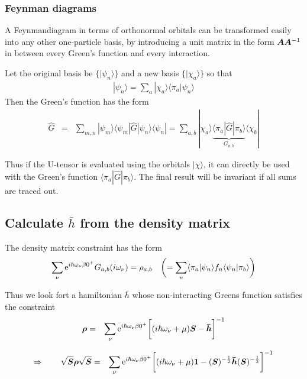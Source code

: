 \documentclass[11pt,a4paper]{report}
\begin{document}
\subsubsection{Feynman diagrams}
A Feynmandiagram in terms of orthonormal orbitals can be transformed
easily into any other one-particle basis, by introducing a unit matrix
in the form $\bm{A}\bm{A}^{-1}$ in between every Green's function
and every interaction. 

Let the original basis be $\{|\psi_n\rangle\}$
and a new basis $\{|\chi_a\rangle\}$ so that
\begin{eqnarray}
|\psi_n\rangle=\sum_a |\chi_a\rangle\langle\pi_a|\psi_n\rangle
\end{eqnarray}
Then the Green's function has the form
\begin{eqnarray}
\hat{G}&=&\sum_{m,n}|\psi_m\rangle
\langle\psi_m|\hat{G}|\psi_n\rangle\langle\psi_n|
=
\sum_{a,b}|\chi_a\rangle
\underbrace{\langle\pi_a|\hat{G}|\pi_b\rangle}_{G_{a,b}}\langle\chi_b|
\end{eqnarray}

Thus if the U-tensor is evaluated using the orbitals $|\chi\rangle$,
it can directly be used with the Green's function
$\langle\pi_a|\hat{G}|\pi_b\rangle$. The final result will be
invariant if all sums are traced out.


\subsection{Calculate $\bar{h}$ from the density matrix}
The density matrix constraint has the form
\begin{eqnarray}
\sum_\nu\mathrm{e}^{i\hbar\omega_\nu\beta0^+}G_{a,b}(i\omega_\nu)
=\rho_{a,b} 
\quad\biggl(=\sum_n\langle\pi_a|\psi_n\rangle f_n\langle\psi_n|\pi_b\rangle
\biggr)
\end{eqnarray}


Thus we look fort a hamiltonian $\bar{h}$ whose non-interacting Greens
function satisfies the constraint
\begin{eqnarray}
\bm{\rho}
&=&\sum_\nu\mathrm{e}^{i\hbar\omega_\nu\beta0^+}
\biggl[(i\hbar\omega_\nu+\mu)\bm{S}-\bm{\bar{h}}\biggr]^{-1}
\end{eqnarray}

\begin{eqnarray}
\Rightarrow\qquad
\sqrt{\bm{S}}\bm{\rho}\sqrt{\bm{S}}
&=&\sum_\nu\mathrm{e}^{i\hbar\omega_\nu\beta0^+}
\biggl[(i\hbar\omega_\nu+\mu)\bm{1}
-(\bm{S})^{-\frac{1}{2}}\bm{\bar{h}}(\bm{S})^{-\frac{1}{2}}\biggr]^{-1}
\end{eqnarray}
\end{document}
